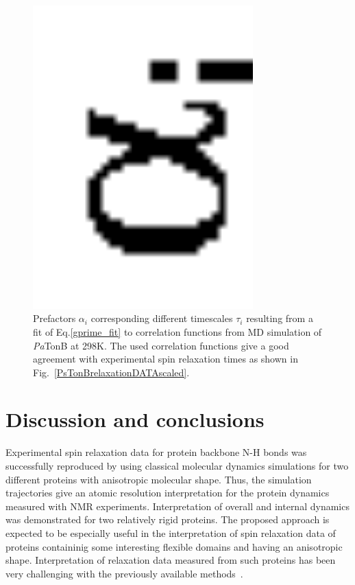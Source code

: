 \documentclass[pre,aps,floatfix,authordate1-4,twocolumn]{revtex4-1}
\begin{document}
\begin{figure}[!h]
  \includegraphics[width=8.5cm]{../Figs/coeffsPLOT.eps}%
  \caption{Prefactors $\alpha_i$ corresponding different timescales $\tau_i$
    resulting from a fit of Eq.\ref{gprime_fit} to correlation functions from
    MD simulation of {\it Pa}TonB at 298K. The used correlation functions give
    a good agreement with experimental spin relaxation times as shown in
    Fig.~\ref{PsTonBrelaxationDATAscaled}.  \label{coeffsPLOT}}%
\end{figure}



\section{Discussion and conclusions}
Experimental spin relaxation data for protein backbone N-H bonds
was successfully reproduced by using classical molecular dynamics
simulations for two different proteins with anisotropic molecular
shape. Thus, the simulation trajectories give an atomic resolution
interpretation for the protein dynamics measured with NMR experiments.
Interpretation of overall and internal dynamics was demonstrated for
two relatively rigid proteins. The proposed approach is expected
to be especially useful in the interpretation of spin relaxation data
of proteins containinig some interesting flexible domains and having
an anisotropic shape. Interpretation of relaxation data measured from
such proteins has been very challenging with the previously available
methods~\cite{barbato92}.
\end{document}
